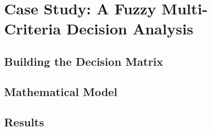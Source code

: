 \chapter{Case Study: A Fuzzy Multi-Criteria Decision Analysis}



\section{Building the Decision Matrix}

\section{Mathematical Model}

\section{Results}
